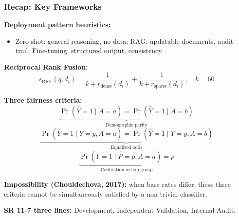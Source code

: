 \documentclass[9pt,t]{beamer}
\begin{document}
\begin{frame}
\frametitle{Recap: Key Frameworks}

\textbf{Deployment pattern heuristics:}
\begin{itemize}
  \item Zero-shot: general reasoning, no data; RAG: updatable documents, audit trail; Fine-tuning: structured output, consistency
\end{itemize}

\textbf{Reciprocal Rank Fusion:}
\[
  s_{\text{RRF}}(q, d_i) = \frac{1}{k + r_{\text{dense}}(d_i)} + \frac{1}{k + r_{\text{sparse}}(d_i)}, \quad k = 60
\]

\textbf{Three fairness criteria:}
\[
  \underbrace{\Pr(\hat{Y}=1 \mid A=a) = \Pr(\hat{Y}=1 \mid A=b)}_{\text{Demographic parity}}
\]
\[
  \underbrace{\Pr(\hat{Y}=1 \mid Y=y, A=a) = \Pr(\hat{Y}=1 \mid Y=y, A=b)}_{\text{Equalized odds}}
\]
\[
  \underbrace{\Pr(Y=1 \mid \hat{P}=p, A=a) = p}_{\text{Calibration within group}}
\]

\textbf{Impossibility (Chouldechova, 2017):} when base rates differ, these three criteria cannot be simultaneously satisfied by a non-trivial classifier.

\textbf{SR 11-7 three lines:} Development, Independent Validation, Internal Audit.
\end{frame}
\end{document}

